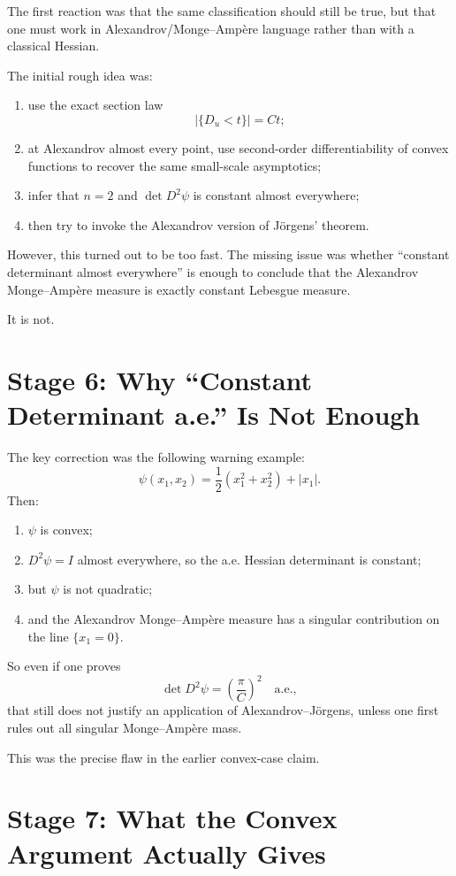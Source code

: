 \documentclass[11pt]{article}
\begin{document}
The first reaction was that the same classification should still be true, but that one must work in Alexandrov/Monge--Amp\`ere language rather than with a classical Hessian.

The initial rough idea was:
\begin{enumerate}[label=\arabic*.]
\item use the exact section law
\[
|\{D_u<t\}|=Ct;
\]
\item at Alexandrov almost every point, use second-order differentiability of convex functions to recover the same small-scale asymptotics;
\item infer that $n=2$ and $\det D^2\psi$ is constant almost everywhere;
\item then try to invoke the Alexandrov version of J\"orgens' theorem.
\end{enumerate}

However, this turned out to be too fast. The missing issue was whether ``constant determinant almost everywhere'' is enough to conclude that the Alexandrov Monge--Amp\`ere measure is exactly constant Lebesgue measure.

It is not.

\section*{Stage 6: Why ``Constant Determinant a.e.'' Is Not Enough}

The key correction was the following warning example:
\[
\psi(x_1,x_2)=\frac12(x_1^2+x_2^2)+|x_1|.
\]
Then:
\begin{enumerate}[label=\arabic*.]
\item $\psi$ is convex;
\item $D^2\psi = I$ almost everywhere, so the a.e. Hessian determinant is constant;
\item but $\psi$ is not quadratic;
\item and the Alexandrov Monge--Amp\`ere measure has a singular contribution on the line $\{x_1=0\}$.
\end{enumerate}

So even if one proves
\[
\det D^2\psi = \left(\frac{\pi}{C}\right)^2
\quad\text{a.e.},
\]
that still does not justify an application of Alexandrov--J\"orgens, unless one first rules out all singular Monge--Amp\`ere mass.

This was the precise flaw in the earlier convex-case claim.

\section*{Stage 7: What the Convex Argument Actually Gives}
\end{document}
